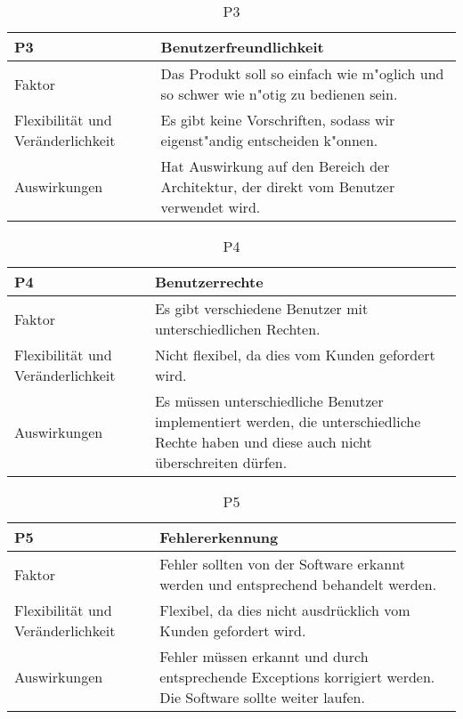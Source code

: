 \begin{table}[H]
\caption{P3}
\begin{tabular}{|p{3cm}|p{12cm}|}\hline
\textbf{P3} &  \textbf{Benutzerfreundlichkeit} \\ \hline \hline
Faktor & Das Produkt soll so einfach wie m"oglich und so schwer wie n"otig zu bedienen sein.\\ \hline
Flexibilität und Veränderlichkeit & Es gibt keine Vorschriften, sodass wir eigenst"andig entscheiden k"onnen.\\ \hline
Auswirkungen & Hat Auswirkung auf den Bereich der Architektur, der direkt vom Benutzer verwendet wird.\\ \hline
\end{tabular}
\end{table}

\begin{table}[H]
\caption{P4}
\begin{tabular}{|p{3cm}|p{12cm}|}\hline
\textbf{P4} &  \textbf{Benutzerrechte} \\ \hline \hline
Faktor & Es gibt verschiedene Benutzer mit unterschiedlichen Rechten.\\ \hline
Flexibilität und Veränderlichkeit & Nicht flexibel, da dies vom Kunden gefordert wird.\\ \hline
Auswirkungen & Es müssen unterschiedliche Benutzer implementiert werden, die unterschiedliche Rechte haben und diese auch nicht überschreiten dürfen. \\ \hline
\end{tabular}
\end{table}

\begin{table}[H]
\caption{P5}
\begin{tabular}{|p{3cm}|p{12cm}|}\hline
\textbf{P5} &  \textbf{Fehlererkennung} \\ \hline \hline
Faktor & Fehler sollten von der Software erkannt werden und entsprechend behandelt werden.\\ \hline
Flexibilität und Veränderlichkeit & Flexibel, da dies nicht ausdrücklich vom Kunden gefordert wird.\\ \hline
Auswirkungen & Fehler müssen erkannt und durch entsprechende Exceptions korrigiert werden. Die Software sollte weiter laufen.  \\ \hline
\end{tabular}
\end{table}

